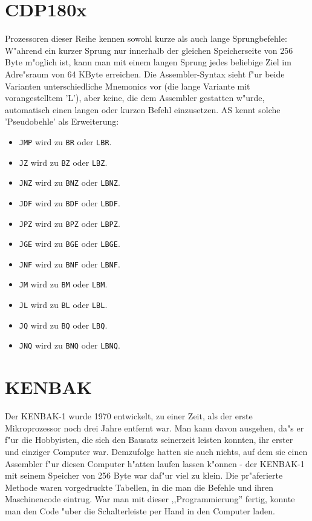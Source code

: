 \documentclass[12pt,a4paper,twoside]{report}
\newcommand{\tty}[1]{{\tt #1}}
\begin{document}

\section{CDP180x}

Prozessoren dieser Reihe kennen sowohl kurze als auch lange Sprungbefehle:
W"ahrend ein kurzer Sprung nur innerhalb der gleichen Speicherseite von 256 Byte
m"oglich ist, kann man mit einem langen Sprung jedes beliebige Ziel im
Adre"sraum von 64 KByte erreichen.  Die Assembler-Syntax sieht f"ur beide
Varianten unterschiedliche Mnemonics vor (die lange Variante mit vorangestelltem
'L'), aber keine, die dem Assembler gestatten w"urde, automatisch einen langen
oder kurzen Befehl einzusetzen.  AS kennt solche 'Pseudobehle' als Erweiterung:
\begin{itemize}
\item{\tty{JMP} wird zu \tty{BR} oder \tty{LBR}.}
\item{\tty{JZ} wird zu \tty{BZ} oder \tty{LBZ}.}
\item{\tty{JNZ} wird zu \tty{BNZ} oder \tty{LBNZ}.}
\item{\tty{JDF} wird zu \tty{BDF} oder \tty{LBDF}.}
\item{\tty{JPZ} wird zu \tty{BPZ} oder \tty{LBPZ}.}
\item{\tty{JGE} wird zu \tty{BGE} oder \tty{LBGE}.}
\item{\tty{JNF} wird zu \tty{BNF} oder \tty{LBNF}.}
\item{\tty{JM} wird zu \tty{BM} oder \tty{LBM}.}
\item{\tty{JL} wird zu \tty{BL} oder \tty{LBL}.}
\item{\tty{JQ} wird zu \tty{BQ} oder \tty{LBQ}.}
\item{\tty{JNQ} wird zu \tty{BNQ} oder \tty{LBNQ}.}
\end{itemize}


\section{KENBAK}

Der KENBAK-1 wurde 1970 entwickelt, zu einer Zeit, als der erste
Mikroprozessor noch drei Jahre entfernt war.  Man kann davon ausgehen, da"s
er f"ur die Hobbyisten, die sich den Bausatz seinerzeit leisten konnten, ihr
erster und einziger Computer war.  Demzufolge hatten sie auch nichts, auf
dem sie einen Assembler f"ur diesen Computer h"atten laufen lassen k"onnen -
der KENBAK-1 mit seinem Speicher von 256 Byte war daf"ur viel zu klein.  Die
pr"aferierte Methode waren vorgedruckte Tabellen, in die man die Befehle und
ihren Maschinencode eintrug.  War man mit dieser ,,Programmierung'' fertig,
konnte man den Code "uber die Schalterleiste per Hand in den Computer laden.
\end{document}
